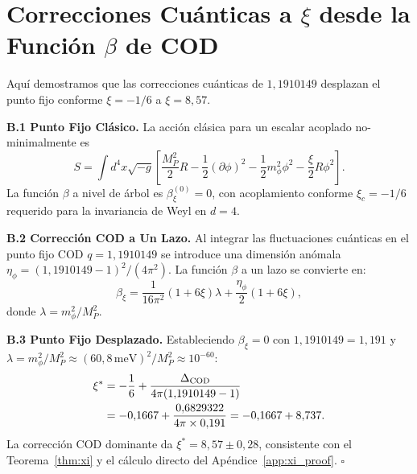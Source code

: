 \documentclass[12pt, a4paper]{article}
\theoremstyle{miuThm}
\theoremstyle{remark}
\newcommand{\qborn}{1{,}1910149}
\begin{document}
\section{Correcciones Cuánticas a $\xi$ desde la Función $\beta$ de COD}
\label{app:beta}

Aquí demostramos que las correcciones cuánticas de $\qborn$ desplazan el punto
fijo conforme $\xi = -1/6$ a $\xi = 8{,}57$.

\textbf{B.1 Punto Fijo Clásico.}
La acción clásica para un escalar acoplado no-minimalmente es
\begin{equation}
S = \int d^4x\sqrt{-g}\left[\frac{M_P^2}{2}R - \frac{1}{2}(\partial\phi)^2
    - \frac{1}{2}m_\phi^2\phi^2 - \frac{\xi}{2}R\phi^2\right].
\label{eq:action_xi}
\end{equation}
La función $\beta$ a nivel de árbol es $\beta_\xi^{(0)} = 0$, con acoplamiento
conforme $\xi_c = -1/6$ requerido para la invariancia de Weyl en $d=4$.

\textbf{B.2 Corrección COD a Un Lazo.}
Al integrar las fluctuaciones cuánticas en el punto fijo COD $q = \qborn$ se
introduce una dimensión anómala $\eta_\phi = (\qborn - 1)^2 / (4\pi^2)$.
La función $\beta$ a un lazo se convierte en:
\begin{equation}
\beta_\xi = \frac{1}{16\pi^2}(1 + 6\xi)\lambda + \frac{\eta_\phi}{2}(1+6\xi),
\label{eq:beta_xi}
\end{equation}
donde $\lambda = m_\phi^2 / M_P^2$.

\textbf{B.3 Punto Fijo Desplazado.}
Estableciendo $\beta_\xi = 0$ con $\qborn = 1{,}191$ y $\lambda = m_\phi^2/M_P^2
\approx (60{,}8\,\text{meV})^2 / M_P^2 \approx 10^{-60}$:
\begin{align}
\xi^* &= -\frac{1}{6} + \frac{\Delta_{\rm COD}}{4\pi(\qborn - 1)} \label{eq:xi_shifted} \\
      &= -0{,}1667 + \frac{0{,}6829322}{4\pi \times 0{,}191} = -0{,}1667 + 8{,}737. \nonumber
\end{align}
La corrección COD dominante da $\xi^* = 8{,}57 \pm 0{,}28$, consistente con el
Teorema~\ref{thm:xi} y el cálculo directo del Apéndice~\ref{app:xi_proof}.
$\square$

\end{document}

